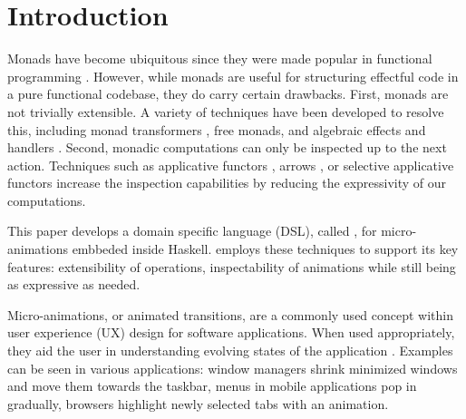 \section{Introduction}
\label{sec:intro}

Monads have become ubiquitous since they were made popular in functional programming \cite{DBLP:conf/lfp/Wadler90}. However, while monads are useful for structuring effectful code in a pure functional codebase, they do carry certain drawbacks. First, monads are not trivially extensible. A variety of techniques have been developed to resolve this, including monad transformers \cite{DBLP:conf/popl/LiangHJ95}, free monads, and algebraic effects and handlers \cite{DBLP:conf/esop/PlotkinP09}. Second, monadic computations can only be inspected up to the next action. Techniques such as applicative functors \cite{DBLP:journals/jfp/McbrideP08}, arrows \cite{DBLP:journals/scp/Hughes00}, or selective applicative functors increase the inspection capabilities by reducing the expressivity of our computations.

This paper develops a domain specific language (DSL), called \dsl{}, for micro-animations embbeded inside Haskell. \dsl{} employs these techniques to support its key features: extensibility of operations, inspectability of animations while still being as expressive as needed.

Micro-animations, or animated transitions, are a commonly used concept within user experience (UX) design for software applications. When used appropriately, they aid the user in understanding evolving states of the application \cite{DBLP:conf/infovis/BedersonB99} \cite{DBLP:conf/chi/Gonzalez96} \cite{DBLP:journals/tvcg/HeerR07}. Examples can be seen in various applications: window managers shrink minimized windows and move them towards the taskbar, menus in mobile applications pop in gradually, browsers highlight newly selected tabs with an animation.

